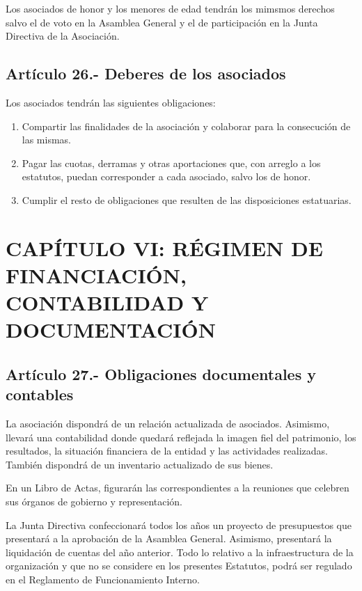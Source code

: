 \documentclass[10pt, spanish, pdftex]{gulplantilla}
\begin{document}
Los asociados de honor y los menores de edad tendrán los mimsmos derechos salvo el de voto en la Asamblea General y el de participación en la Junta Directiva de la Asociación.

\subsection{Artículo 26.- Deberes de los asociados}
Los asociados tendrán las siguientes obligaciones:
\begin{enumerate}[label=\alph*)]
    \item Compartir las finalidades de la asociación y colaborar para la consecución de las mismas.
    \item Pagar las cuotas, derramas y otras aportaciones que, con arreglo a los estatutos, puedan corresponder a cada asociado, salvo los de honor.
    \item Cumplir el resto de obligaciones que resulten de las disposiciones estatuarias.
\end{enumerate}


\newpage {}
\section{CAPÍTULO VI: RÉGIMEN DE FINANCIACIÓN, CONTABILIDAD Y DOCUMENTACIÓN}


\subsection{Artículo 27.- Obligaciones documentales y contables}
La asociación dispondrá de un relación actualizada de asociados. Asimismo, llevará una contabilidad donde quedará reflejada la imagen fiel del patrimonio, los resultados, la situación financiera de la entidad y las actividades realizadas. También dispondrá de un inventario actualizado de sus bienes.

En un Libro de Actas, figurarán las correspondientes a la reuniones que celebren sus órganos de gobierno y representación.

La Junta Directiva confeccionará todos los años un proyecto de presupuestos que presentará a la aprobación de la Asamblea General. Asimismo, presentará la liquidación de cuentas del año anterior. Todo lo relativo a la infraestructura de la organización y que no se considere en los presentes Estatutos, podrá ser regulado en el Reglamento de Funcionamiento Interno.
\end{document}
